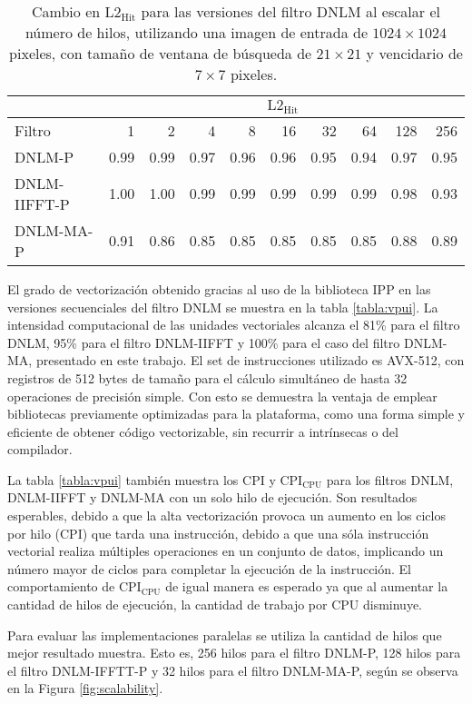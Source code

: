 \begin{table}
\centering
\caption[Cambio en la raz\'on de aciertos de lectura en cach\'e L2 para los filtros al escalar el n\'umero de hilos]{Cambio en  $\text{L2}_{\text{Hit}}$ para las versiones del filtro DNLM al escalar el n\'umero de hilos, utilizando una imagen de entrada de $1024 \times 1024$ pixeles, con tama\~no de ventana de búsqueda de $21 \times 21$ y vencidario de $7 \times 7$ pixeles. \label{tabla:l2_hit}}
\begin{tabular}{lrrrrrrrrr}
& \multicolumn{9}{c}{$\text{L2}_{\text{Hit}}$} \tabularnewline
\hline
 Filtro & 1 & 2 & 4 & 8 & 16 & 32 & 64 & 128 & 256 \tabularnewline
\hline
DNLM-P & 0.99 & 0.99 & 0.97 & 0.96 & 0.96 & 0.95 & 0.94 & 0.97 & 0.95 \tabularnewline
DNLM-IIFFT-P & 1.00 & 1.00 & 0.99 & 0.99 & 0.99 & 0.99 & 0.99 & 0.98 & 0.93 \tabularnewline
DNLM-MA-P & 0.91 & 0.86 & 0.85 & 0.85 & 0.85 & 0.85 & 0.85 & 0.88 & 0.89 \tabularnewline
\end{tabular}
\end{table}


El grado de vectorizaci\'on obtenido gracias al uso de la biblioteca IPP en las versiones secuenciales del filtro DNLM se muestra en la tabla \ref{tabla:vpui}. La intensidad computacional de las unidades vectoriales alcanza el 81\% para el filtro DNLM, 95\% para el filtro DNLM-IIFFT y 100\% para el caso del filtro DNLM-MA, presentado en este trabajo. El set de instrucciones utilizado es AVX-512, con registros de 512 bytes de tama\~no para el c\'alculo simult\'aneo de hasta 32 operaciones de precisi\'on simple. Con esto se demuestra la ventaja de emplear bibliotecas previamente optimizadas para la plataforma, como una forma simple y eficiente de obtener c\'odigo vectorizable, sin recurrir a intr\'insecas o  del compilador.


La tabla \ref{tabla:vpui} tambi\'en muestra los CPI y $\text{CPI}_{\text{CPU}}$ para los filtros DNLM, DNLM-IIFFT y DNLM-MA con un solo hilo de ejecución. Son resultados esperables, debido a que la alta vectorizaci\'on provoca un aumento en los ciclos por hilo (CPI) que tarda una instrucci\'on, debido a que una s\'ola instrucci\'on vectorial realiza m\'ultiples operaciones en un conjunto de datos, implicando un n\'umero mayor de ciclos para completar la ejecuci\'on de la instrucci\'on. El comportamiento de $\text{CPI}_{\text{CPU}}$ de igual manera es esperado ya que al aumentar la cantidad de hilos de ejecuci\'on, la cantidad de trabajo por CPU disminuye. 


Para evaluar las implementaciones paralelas se utiliza la cantidad de hilos que mejor resultado muestra. Esto es, 256 hilos para el filtro DNLM-P, 128 hilos para el filtro DNLM-IFFTT-P y 32 hilos para el filtro DNLM-MA-P, según se observa en la Figura \ref{fig:scalability}. 



